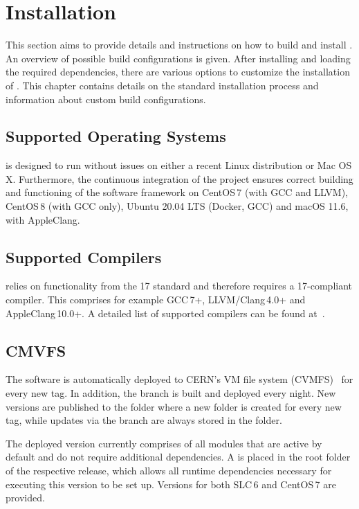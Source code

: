 \chapter{Installation}
\label{ch:installation}

This section aims to provide details and instructions on how to build and install \corry.
An overview of possible build configurations is given.
After installing and loading the required dependencies, there are various options to customize the installation of \corry.
This chapter contains details on the standard installation process and information about custom build configurations.

\section{Supported Operating Systems}
\label{sec:os}
\corry is designed to run without issues on either a recent Linux distribution or Mac OS\,X.
Furthermore, the continuous integration of the project ensures correct building and functioning of the software framework on CentOS\,7 (with GCC and LLVM), CentOS\,8 (with GCC only), Ubuntu 20.04 LTS (Docker, GCC) and macOS 11.6, with AppleClang.

\section{Supported Compilers}
\label{sec:compilers}
\corry relies on functionality from the {\CPP}17 standard and therefore requires a {\CPP}17-compliant compiler.
This comprises for example GCC\,7+, LLVM/Clang\,4.0+ and AppleClang\,10.0+. A detailed list of supported compilers can be found at~\cite{cppcompilersupport}.

\section{CMVFS}
\label{sec:cvmfs_install}
The software is automatically deployed to CERN's VM file system (CVMFS)~\cite{cvmfs} for every new tag.
In addition, the  branch is built and deployed every night.
New versions are published to the folder  where a new folder is created for every new tag, while updates via the  branch are always stored in the  folder.

The deployed version currently comprises of all modules that are active by default and do not require additional dependencies.
A  is placed in the root folder of the respective release, which allows all runtime dependencies necessary for executing this version to be set up.
Versions for both SLC\,6 and CentOS\,7 are provided.

